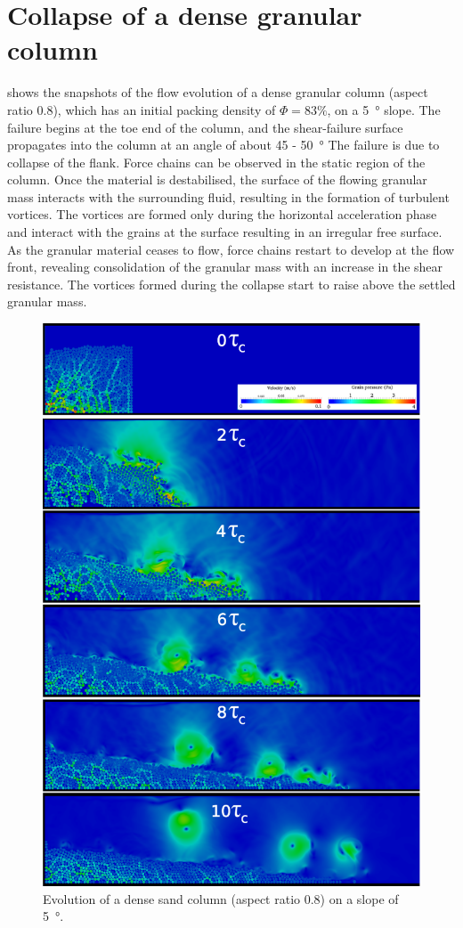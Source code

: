 \documentclass[12pt,twoside]{tuhhproc-en}
\begin{document}
\section{Collapse of a dense granular column}
 shows the snapshots of the flow evolution of a dense granular column (aspect ratio 0.8), which has an initial packing density of $\Phi = 83\%$, on a \SI{5}{\degree} slope. The failure begins at the toe end of the column, and the shear-failure surface propagates into the column at an angle of about 45 - \SI{50}{\degree} The failure is due to collapse of the flank.  Force chains can be observed in the static region of the column. Once the material is destabilised, the surface of the flowing granular mass interacts with the surrounding fluid, resulting in the formation of turbulent vortices. The vortices are formed only during the horizontal acceleration phase and interact with the grains at the surface resulting in an irregular free surface. As the granular material ceases to flow, force chains restart to develop at the flow front, revealing consolidation of the granular mass with an increase in the shear resistance. The vortices formed during the collapse start to raise above the settled granular mass.

\begin{figure}[htpb]
  \centering
\includegraphics[width=0.9\columnwidth]{figs/dense_s5_r09}
\caption{Evolution of a dense sand column (aspect ratio 0.8) on a slope of \SI{5}{\degree}. }
\label{fig:dense-s5-r09}
\end{figure}
\end{document}
